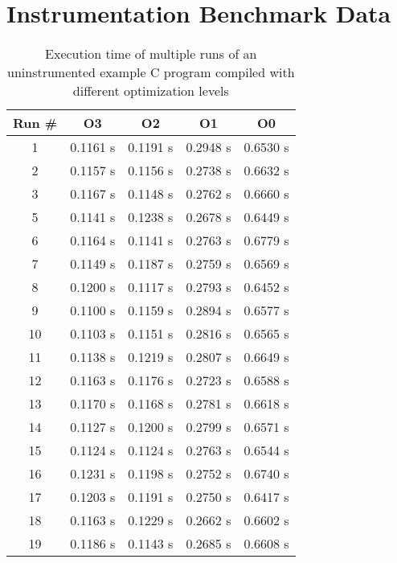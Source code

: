 

\clearpage

\section{Instrumentation Benchmark Data}
\label{sec:appendix:instrumentation_benchmark_data}

\begin{table}[]
  \caption{Execution time of multiple runs of an uninstrumented example C program compiled with different optimization levels}
  \label{table:non_instrumented_optimizations_benchmark}
  \centering
  \begin{tabular}{cllll}
    Run \# & \multicolumn{1}{c}{O3} & \multicolumn{1}{c}{O2} & \multicolumn{1}{c}{O1} & \multicolumn{1}{c}{O0} \\ \hline
    1 & 0.1161 s & 0.1191 s & 0.2948 s & 0.6530 s \\
    2 & 0.1157 s & 0.1156 s & 0.2738 s   & 0.6632 s \\
    3 & 0.1167 s & 0.1148 s & 0.2762 s & 0.6660 s \\
    5 & 0.1141 s & 0.1238 s & 0.2678 s & 0.6449 s \\
    6 & 0.1164 s & 0.1141 s & 0.2763 s & 0.6779 s \\
    7 & 0.1149 s & 0.1187 s & 0.2759 s & 0.6569 s \\
    8 & 0.1200 s & 0.1117 s & 0.2793 s & 0.6452 s \\
    9 & 0.1100 s & 0.1159 s & 0.2894 s & 0.6577 s \\
    10 &0.1103 s & 0.1151 s & 0.2816 s & 0.6565 s  \\
    11 &0.1138 s & 0.1219 s & 0.2807 s & 0.6649 s \\
    12 &0.1163 s & 0.1176 s & 0.2723 s & 0.6588 s \\
    13 &0.1170 s & 0.1168 s & 0.2781 s & 0.6618 s \\
    14 &0.1127 s & 0.1200 s & 0.2799 s & 0.6571 s \\
    15 &0.1124 s & 0.1124 s & 0.2763 s & 0.6544 s \\
    16 &0.1231 s & 0.1198 s & 0.2752 s & 0.6740 s \\
    17 &0.1203 s & 0.1191 s & 0.2750 s & 0.6417 s \\
    18 &0.1163 s & 0.1229 s & 0.2662 s & 0.6602 s \\
    19 &0.1186 s & 0.1143 s & 0.2685 s & 0.6608 s    \\

\end{tabular}
\end{table}
